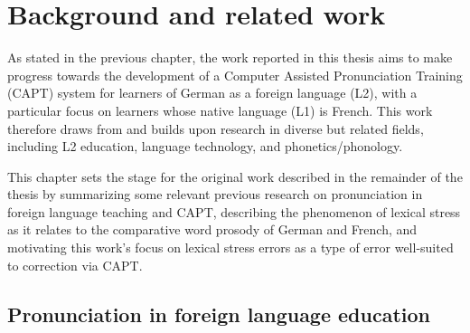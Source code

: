 %
%
\chapter{Background and related work}
\label{chap:background}


As stated in the previous chapter, the work reported in this thesis aims to make progress towards the development of a Computer Assisted Pronunciation Training (CAPT) system for learners of German as a foreign language (L2), with a particular focus on learners whose native language (L1) is French. This work therefore draws from and builds upon research in diverse but related fields, including L2 education, language technology, and phonetics/phonology.

This chapter sets the stage for the original work described in the remainder of the thesis by summarizing some relevant previous research on pronunciation in foreign language teaching and CAPT, describing the phenomenon of lexical stress as it relates to the comparative word prosody of German and French, and motivating this work's focus on lexical stress errors as a type of error well-suited to correction via CAPT.


	\section{Pronunciation in foreign language education}
	\label{sec:bkgd:l2ed}
%	


